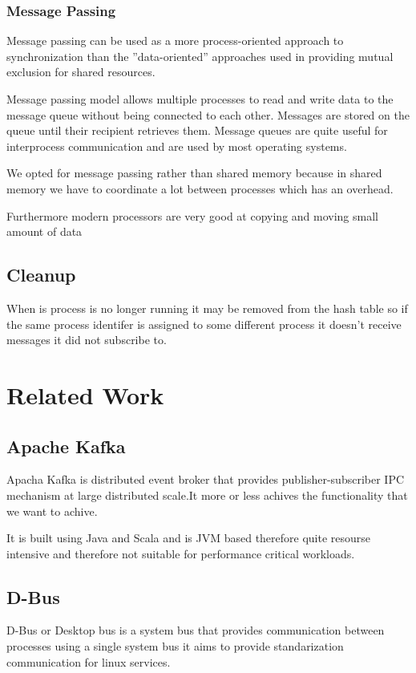 \documentclass[12pt]{report}
\begin{document}
    \subsection{Message Passing}
    Message passing can be used as a more process-oriented approach to synchronization 
    than the ”data-oriented” approaches used in providing mutual
    exclusion for shared resources.

    Message passing model allows multiple processes to read and write data
    to the message queue without being connected to each other. Messages are
    stored on the queue until their recipient retrieves them. Message queues are
    quite useful for interprocess communication and are used by most operating
    systems.

    We opted for message passing rather than shared memory because in
    shared memory we have to coordinate a lot between processes which has an
    overhead.

    Furthermore modern processors are very good at copying and moving
    small amount of data

	\section{Cleanup}
	When is process is no longer running it may be removed from the hash table
	so if the same process identifer is assigned to some different process it 
	doesn't receive messages it did not subscribe to.
    
	\chapter{Related Work}
	\section{Apache Kafka}
	Apacha Kafka is distributed event broker that provides publisher-subscriber 
	IPC mechanism at large distributed scale.It more or less achives the functionality 
	that we want to achive.
	
	It is built using Java and Scala and is JVM based therefore quite resourse intensive
	and therefore not suitable for performance critical workloads.
	
	\section{D-Bus}
	D-Bus or Desktop bus is a system bus that provides communication between processes
	using a single system bus it aims to provide standarization communication for 
	linux services.
	
\end{document}
